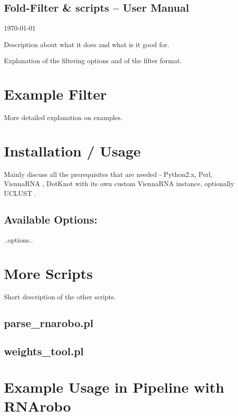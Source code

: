 \documentclass[11pt]{article}
\begin{document}


\begin{center}
\section*{Fold-Filter \& scripts -- User Manual}
\today
\end{center}

Description about what it does and what is it good for.

Explanation of the filtering options and of the filter format.

\section*{Example Filter}
More detailed explanation on examples.

\section*{Installation / Usage}
Mainly discuss all the prerequisites that are needed - Python2.x, Perl, ViennaRNA \cite{lorenz2011viennarna}, DotKnot \cite{sperschneider2010dotknot, sperschneider2011heuristic} with its own custom ViennaRNA instance, optionally UCLUST \cite{edgar2010search}.

\subsection*{Available Options:}
..options..

\section*{More Scripts}
Short description of the other scripts.
\subsection*{parse\_rnarobo.pl}
\subsection*{weights\_tool.pl}

\section*{Example Usage in Pipeline with RNArobo}


 
\end{document}
